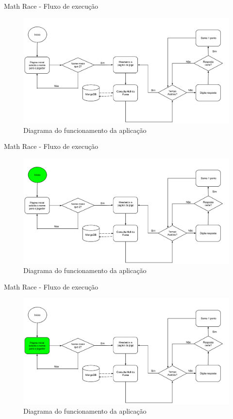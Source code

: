 \documentclass{beamer}
\begin{document}
\begin{frame}{Math Race - Fluxo de execução}
    \begin{figure}[htb]
    \centering
    \includegraphics[scale=0.2]{../images/func_mr.png}
    \caption{Diagrama do funcionamento da aplicação}
    \label{fig: func_mr0}
    \end{figure}
\end{frame}
\begin{frame}{Math Race - Fluxo de execução}
    \begin{figure}[htb]
    \centering
    \includegraphics[scale=0.2]{../images/func_mr_s1.png}
    \caption{Diagrama do funcionamento da aplicação}
    \label{fig: func_mr1}
    \end{figure}
\end{frame}
\begin{frame}{Math Race - Fluxo de execução}
    \begin{figure}[htb]
    \centering
    \includegraphics[scale=0.2]{../images/func_mr_s2.png}
    \caption{Diagrama do funcionamento da aplicação}
    \label{fig: func_mr2}
    \end{figure}
\end{frame}
\end{document}
